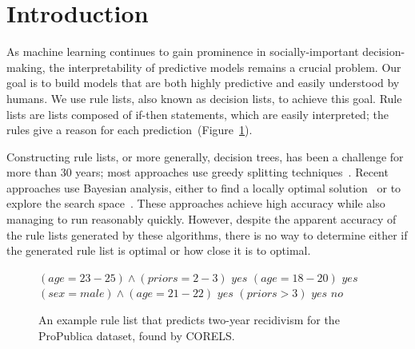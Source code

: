 %
%
%
%
%
%

\section{Introduction}

As machine learning continues to gain prominence in socially-important decision-making,
the interpretability of predictive models remains a crucial problem.
%
Our goal is to build models that are both highly predictive and easily understood by humans.
%
We use rule lists, also known as decision lists, to achieve this goal.
%
Rule lists are lists composed of if-then statements, which are easily interpreted; the rules give a reason for each prediction~(Figure~\ref{fig:rule-list}).

Constructing rule lists, or more generally, decision trees, has been a challenge for more than
30 years; most approaches use greedy splitting techniques~\citep{Rivest87,Breiman84,Quinlan93}. 
%
Recent approaches use Bayesian analysis, either to find a locally optimal solution~\citep{Chipman:1998jh} or to explore the search space~\citep{LethamRuMcMa15, YangRuSe16}.
%
These approaches achieve high accuracy while also managing to run reasonably quickly. However, despite the apparent accuracy of the rule lists generated by these algorithms, there is no way to determine either if the generated rule list is optimal or how close it is to optimal.

\begin{arxiv}
\begin{figure}[t!]
\begin{algorithmic}
\State \bif $(age=23-25) \wedge (priors=2-3)$ \bthen $yes$
\State \belif $(age=18-20)$ \bthen $yes$
\State \belif $(sex=male) \wedge (age=21-22)$ \bthen $yes$
\State \belif $(priors>3)$ \bthen $yes$
\State \belse $no$
\end{algorithmic}
\caption{An example rule list that predicts two-year recidivism
for the ProPublica dataset, found by CORELS.
}
\label{fig:rule-list}
\end{figure}
\end{arxiv}

